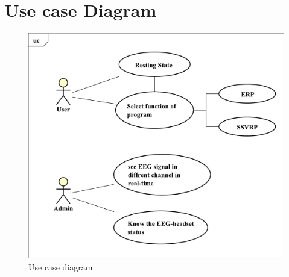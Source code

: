 \section{Use case Diagram}
\begin{figure}[ht]
	\centering
	\includegraphics[scale = 0.5]{chapter4/uc.pdf}
	\caption{Use case diagram}
\end{figure}

\newpage

